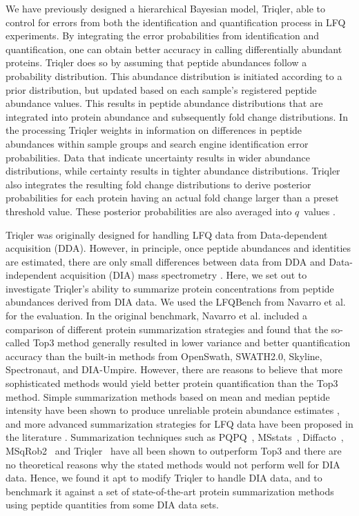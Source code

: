 \documentclass[10pt,letterpaper]{article}
\begin{document}
We have previously designed a hierarchical Bayesian model, Triqler, able to control for errors from both the identification and quantification process in LFQ experiments\cite{the2019integrated}. By integrating the error probabilities from identification and quantification, one can obtain better accuracy in calling differentially abundant proteins. Triqler does so by assuming that peptide abundances follow a probability distribution. This abundance distribution is initiated according to a prior distribution, but updated based on each sample's registered peptide abundance values. This results in peptide abundance distributions that are integrated into protein abundance and subsequently fold change distributions. In the processing Triqler weights in information on differences in peptide abundances within sample groups and search engine identification error probabilities. Data that indicate uncertainty results in wider abundance distributions, while certainty results in tighter abundance distributions. Triqler also integrates the resulting fold change distributions to derive posterior probabilities for each protein having an actual fold change larger than a preset threshold value. These posterior probabilities are also averaged into $q$~values \cite{the2019integrated}.

Triqler was originally designed for handling LFQ data from Data-dependent acquisition (DDA). However, in principle, once peptide abundances and identities are estimated, there are only small differences between data from DDA and Data-independent acquisition (DIA) mass spectrometry \cite{venable2004automated}. Here, we set out to investigate Triqler's ability to summarize protein concentrations from peptide abundances derived from DIA data. We used the LFQBench from Navarro et al. \cite{navarro2016multicenter} for the evaluation. In the original benchmark, Navarro et al. included a comparison of different protein summarization strategies and found that the so-called Top3 method generally resulted in lower variance and better quantification accuracy than the built-in methods from OpenSwath, SWATH2.0, Skyline, Spectronaut, and DIA-Umpire\cite{navarro2016multicenter}. However, there are reasons to believe that more sophisticated methods would yield better protein quantification than the Top3 method. Simple summarization methods based on mean and median peptide intensity have been shown to produce unreliable protein abundance estimates \cite{goeminne2015summarization}, and more advanced summarization strategies for LFQ data have been proposed in the literature \cite{silva2006absolute,cox2014accurate}. Summarization techniques such as PQPQ~\cite{forshed2011enhanced}, MSstats~\cite{choi2014msstats}, Diffacto~\cite{zhang2017covariation}, MSqRob2~\cite{sticker2020robust} and Triqler~\cite{the2019integrated} have all been shown to outperform Top3 and there are no theoretical reasons why the stated methods would not perform well for DIA data. Hence, we found it apt to modify Triqler to handle DIA data, and to benchmark it against a set of state-of-the-art protein summarization methods using peptide quantities from some DIA data sets.
 
\end{document}
